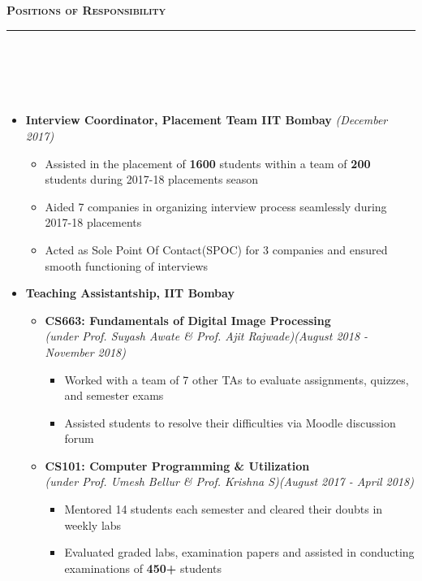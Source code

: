 \documentclass[a4paper,10pt]{article}
\newcommand{\lsep}{-0.5cm}
\newcommand{\resheading}[1]{{\small
        {
            \begin{minipage}
                {0.992\textwidth}\textbf{{\textsc{#1 \vphantom{p\^{E}} }}}
                \\[-0.3cm]
                \hrule
            \end{minipage}
            \\[-0.5cm]
        }
 }}
\begin{document}
\resheading{\textbf{\large Positions of Responsibility}}\\[\lsep] 
\\[-0.4cm]
\begin{itemize}
  \item \textbf{Interview Coordinator,
  Placement Team IIT Bombay} \emph{\hfill(December 2017)} \\[-0.6cm]
  \begin{itemize}
    \item Assisted in the placement of \textbf{1600} students within a team of \textbf{200} students during 2017-18 placements season
    \item Aided 7 companies in organizing interview process seamlessly during 2017-18 placements
    \item Acted as Sole Point Of Contact(SPOC) for 3 companies and ensured smooth functioning of interviews\\[-0.5cm]
  \end{itemize}
  \item \textbf{Teaching Assistantship, IIT Bombay} \\[-0.6cm]
    \begin{itemize}
         \item \textbf{CS663: Fundamentals of Digital Image Processing} \\ \emph{(under Prof. Suyash Awate \& Prof. Ajit Rajwade)}\hfill \emph{(August 2018 - November 2018)}
        \begin{itemize}
                \item Worked with a team of 7 other TAs to evaluate assignments, quizzes, and semester exams   
                \item Assisted students to resolve their difficulties via Moodle discussion forum
        \end{itemize} 
       \item \textbf{CS101: Computer Programming \& Utilization}\\ \emph{(under Prof. Umesh Bellur \& Prof. Krishna S)}\hfill \emph{(August 2017 - April 2018)}
       \begin{itemize}
           \item Mentored 14 students each semester and cleared their doubts in weekly labs
    	   \item Evaluated graded labs, examination papers and assisted in conducting examinations of \textbf{450+} students 
       \end{itemize} 
    \end{itemize}
\end{itemize}
\end{document}
